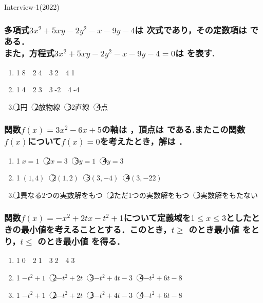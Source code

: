 \documentclass[onecolumn,10pt]{jarticle}
\newcommand{\ctext}[1]{\textcircled{\scriptsize #1}}
\begin{document}
\begin{flushright}
    Interview-1(2022)
\end{flushright}

\subsubsection{多項式$3x^2+5xy-2y^2-x-9y-4$は  次式であり，その定数項は  である．\\
また，方程式$3x^2+5xy-2y^2-x-9y-4=0$は  を表す.}
\begin{enumerate}[(1)]
    \item \ctext{1}8　\ctext{2}4　\ctext{3}2　\ctext{4}1
    \item \ctext{1}4　\ctext{2}3　\ctext{3}-2　\ctext{4}-4
    \item \ctext{1}円　\ctext{2}放物線　\ctext{3}2直線　\ctext{4}点
\end{enumerate}

\subsubsection{関数$f(x)=3x^2-6x+5$の軸は  ，頂点は  である.またこの関数$f(x)$について$f(x)=0$を考えたとき，解は  ．}
\begin{enumerate}[(1)]
    \item \ctext{1}$x=1$　\ctext{2}$x=3$　\ctext{3}$y=1$　\ctext{4}$y=3$
    \item \ctext{1}$(1,4)$　\ctext{2}$(1,2)$　\ctext{3}$(3,-4)$　\ctext{4}$(3,-22)$
    \item \ctext{1}異なる2つの実数解をもつ　\ctext{2}ただ1つの実数解をもつ　\ctext{3}実数解をもたない
\end{enumerate}

\subsubsection{関数$f(x)=-x^2+2tx-t^2+1$について定義域を$1\leq x\leq3$としたときの最小値を考えることとする．このとき，$t\geq$  のとき最小値  をとり，$t\leq$  のとき最小値  を得る．}
\begin{enumerate}[(1)]
    \item \ctext{1}0　\ctext{2}1　\ctext{3}2　\ctext{4}3
    \item \ctext{1}$-t^2+1$　\ctext{2}$-t^2+2t$　\ctext{3}$-t^2+4t-3$　\ctext{4}$-t^2+6t-8$
    \item \ctext{1}$-t^2+1$　\ctext{2}$-t^2+2t$　\ctext{3}$-t^2+4t-3$　\ctext{4}$-t^2+6t-8$
\end{enumerate}
\end{document}
